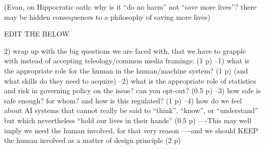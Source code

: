(Evan, on Hippocratic oath: why is it ``do no harm'' not ``save more
lives''?
there may be hidden consequences to a philosophy of saving more lives)


EDIT THE BELOW

2) wrap up with the big questions we are faced with, that we have to
grapple with instead of accepting teleology/common media framings: (1
p)
--1) what is the appropriate role for the human in the human/machine
system? (1 p) (and what skills do they need to acquire)
--2) what is the appropriate role of statistics and risk in governing
policy on the issue? can you opt-out? (0.5 p)
--3) how safe is safe enough? for whom? and how is this regulated? (1
p)
--4) how do we feel about AI systems that cannot really be said to
``think'', ``know'', or ``understand'' but which nevertheless ``hold
our lives in their hands'' (0.5 p)
----This may well imply we need the human involved, for that very
reason
----and we should KEEP the human involved as a matter of design
principle (2 p)

